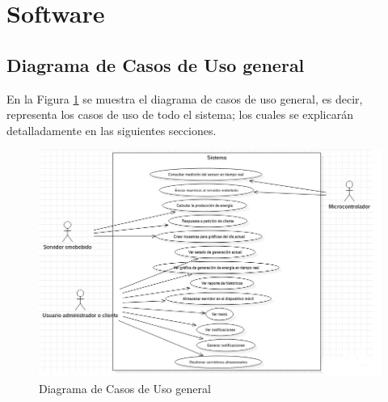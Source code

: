 \section{Software}

\subsection{Diagrama de Casos de Uso general}
En la Figura \ref{fig:dcu-general} se muestra el diagrama de casos de uso general, es decir, representa los casos de uso de todo el sistema; los cuales se explicarán detalladamente en las siguientes secciones.
\begin{figure}[H]
	\centering
	\includegraphics[scale=.56]{Capitulo4/software/submodulos/images/dcugeneral.jpg}
	\caption{Diagrama de Casos de Uso general}
	\label{fig:dcu-general}
\end{figure}


